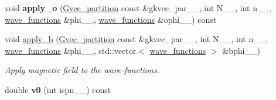 \begin{DoxyCompactItemize}
\item 
\hypertarget{classsirius_1_1_local__operator_a072f75be5d94bee23ffb32c3a0d0652b}{}void {\bfseries apply\+\_\+o} (\hyperlink{classsddk_1_1_gvec__partition}{Gvec\+\_\+partition} const \&gkvec\+\_\+par\+\_\+\+\_\+, int N\+\_\+\+\_\+, int n\+\_\+\+\_\+, \hyperlink{classsddk_1_1wave__functions}{wave\+\_\+functions} \&phi\+\_\+\+\_\+, \hyperlink{classsddk_1_1wave__functions}{wave\+\_\+functions} \&ophi\+\_\+\+\_\+) const \label{classsirius_1_1_local__operator_a072f75be5d94bee23ffb32c3a0d0652b}

\item 
void \hyperlink{classsirius_1_1_local__operator_afc562ca0f1283fd1bdeebc37fe884364}{apply\+\_\+b} (\hyperlink{classsddk_1_1_gvec__partition}{Gvec\+\_\+partition} const \&gkvec\+\_\+par\+\_\+\+\_\+, int N\+\_\+\+\_\+, int n\+\_\+\+\_\+, \hyperlink{classsddk_1_1wave__functions}{wave\+\_\+functions} \&phi\+\_\+\+\_\+, std\+::vector$<$ \hyperlink{classsddk_1_1wave__functions}{wave\+\_\+functions} $>$ \&bphi\+\_\+\+\_\+)
\begin{DoxyCompactList}\small\item\em Apply magnetic field to the wave-\/functions. \end{DoxyCompactList}\item 
\hypertarget{classsirius_1_1_local__operator_a5ab597550578e61aac3b99d6b09abaf4}{}double {\bfseries v0} (int ispn\+\_\+\+\_\+) const \label{classsirius_1_1_local__operator_a5ab597550578e61aac3b99d6b09abaf4}

\end{DoxyCompactItemize}
